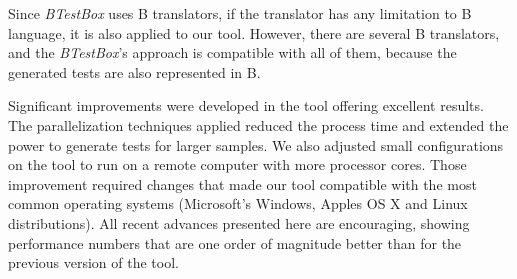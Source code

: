 \documentclass[runningheads]{llncs}
\begin{document}


Since  \textit{BTestBox} uses B translators, if the translator has any limitation to B language, it is also applied to our tool. However, there are several B translators, and the  \textit{BTestBox}'s approach is compatible with all of them, because the generated tests are also represented in B. 

Significant improvements were developed in the tool offering excellent results.
The parallelization techniques applied reduced the process time and extended the power to generate tests for larger samples. We also adjusted small configurations on the tool to run on a remote computer with more processor cores. Those improvement required changes that made our tool compatible with the most common operating systems (Microsoft’s Windows, Apple\textquotesingle s OS X and Linux distributions). All recent advances presented here are encouraging, showing performance numbers that are one order of magnitude better than for the previous version of the tool.





%
%
%




 
\end{document}
